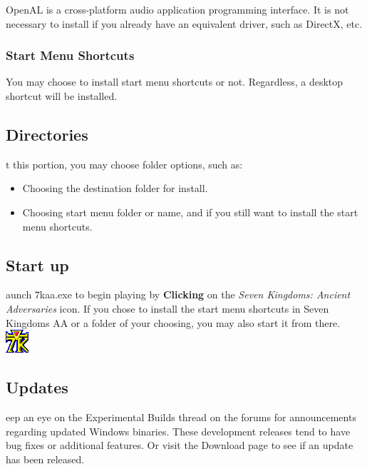 OpenAL is a cross-platform audio application programming interface. It is not necessary to install if you already have an equivalent driver, such as DirectX, etc.

\subsubsection{Start Menu Shortcuts}

You may choose to install start menu shortcuts or not. Regardless, a desktop shortcut will be installed.  

\subsection{Directories}

t this portion, you may choose folder options, such as:

\begin{itemize}
	\item Choosing the destination folder for install.
	\item Choosing start menu folder or name, and if you still want to install the start menu shortcuts.
\end{itemize}

\subsection{Start up}

aunch 7kaa.exe to begin playing by \textbf{Clicking} on the \textit{Seven Kingdoms: Ancient Adversaries} icon. If you chose to install the start menu shortcuts in Seven Kingdoms AA or a folder of your choosing, you may also start it from there. \\ %

\includegraphics[width=0.07\linewidth]{7kicon} %

\subsection{Updates}

eep an eye on the Experimental Builds thread on the forums for announcements regarding updated Windows binaries. These development releases tend to have bug fixes or additional features. Or visit the Download page to see if an update has been released.

